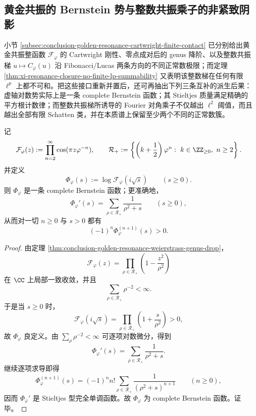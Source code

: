 \subsection{黄金共振的 Bernstein 势与整数共振乘子的非紧致阴影}

小节 \ref{subsec:conclusion-golden-resonance-cartwright-finite-contact} 已分别给出黄金共振整函数
\(\mathcal F_\varphi\)
的 Cartwright 刚性、零点成对后的 genus 降阶、以及整数共振梯
\(u\mapsto C_\varphi(u)\)
沿 Fibonacci/Lucas 两条方向的不同正常数极限；而定理
\ref{thm:xi-resonance-closure-no-finite-lp-summability}
又表明该整数梯在任何有限 \(\ell^p\) 上都不可和。把这些接口重新并置后，还可再抽出下列三条互补的派生后果：虚轴对数势实际上是一条 complete Bernstein 函数；其 Stieltjes 质量满足精确的平方根计数律；而整数共振梯所诱导的 Fourier 对角乘子不仅越出 \(\ell^2\) 阈值，而且越出全部有限 Schatten 类，并在本质谱上保留至少两个不同的正常数簇。

\begin{theorem}\label{thm:derived-golden-resonance-complete-bernstein-potential}
记
\[
\mathcal F_\varphi(z):=\prod_{n=2}^{\infty}\cos(\pi z\varphi^{-n}),
\qquad
\mathcal R_+:=
\left\{
\left(k+\frac12\right)\varphi^n:\ k\in\ZZ_{\ge 0},\ n\ge 2
\right\}.
\]
并定义
\[
\Phi_\varphi(s):=\log \mathcal F_\varphi(i\sqrt s)
\qquad (s\ge 0).
\]
则 \(\Phi_\varphi\) 是一条 complete Bernstein 函数；更准确地，
\[
\Phi_\varphi'(s)=\sum_{\rho\in \mathcal R_+}\frac{1}{\rho^2+s}
\qquad (s\ge 0),
\]
从而对一切 \(n\ge 0\) 与 \(s>0\) 都有
\[
(-1)^n\Phi_\varphi^{(n+1)}(s)>0.
\]
\end{theorem}

\begin{proof}
由定理 \ref{thm:conclusion-golden-resonance-weierstrass-genus-drop}，
\[
\mathcal F_\varphi(z)=\prod_{\rho\in\mathcal R_+}\left(1-\frac{z^2}{\rho^2}\right)
\]
在 \(\CC\) 上局部一致收敛，并且
\[
\sum_{\rho\in\mathcal R_+}\rho^{-2}<\infty.
\]
于是当 \(s\ge 0\) 时，
\[
\mathcal F_\varphi(i\sqrt s)
=
\prod_{\rho\in\mathcal R_+}\left(1+\frac{s}{\rho^2}\right)>0,
\]
故 \(\Phi_\varphi\) 良定义。由
\(\sum_{\rho}\rho^{-2}<\infty\)
可逐项对数微分，得到
\[
\Phi_\varphi'(s)
=
\sum_{\rho\in\mathcal R_+}\frac{1}{\rho^2+s}.
\]
继续逐项求导即得
\[
\Phi_\varphi^{(n+1)}(s)
=
(-1)^n n!\sum_{\rho\in\mathcal R_+}\frac{1}{(\rho^2+s)^{n+1}}
\qquad (n\ge 0),
\]
因而 \(\Phi_\varphi'\) 是 Stieltjes 型完全单调函数。故 \(\Phi_\varphi\) 为 complete Bernstein 函数。证毕。
\end{proof}

